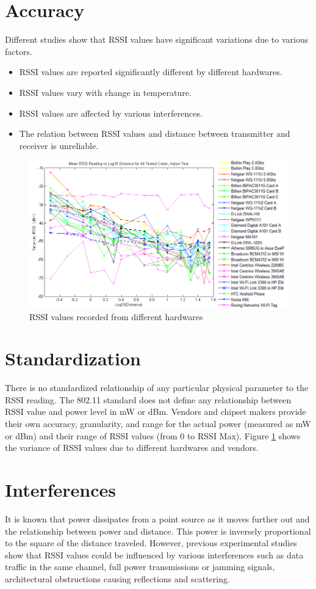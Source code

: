 \documentclass[11pt,a4paper,headinclude,footinclude,chapterprefix=on]{scrreprt}
\begin{document}
\section{Accuracy} Different studies \cite{ref:wifi:chipset} show that RSSI values have significant variations due to various factors. 
\begin{itemize}
	\item RSSI values are reported significantly different by different hardwares. 
	\item RSSI values vary with change in temperature. 
	\item RSSI values are affected by various interferences. 
	\item The relation between RSSI values and distance between transmitter and receiver is unreliable. 
\end{itemize}
\begin{figure}
	[!h] \centering 
	\includegraphics[width=13cm]{Images/rssi_vendor1.png} \caption{RSSI values recorded from different hardwares} \label{fig:rssi_vendors} 
\end{figure}

\section{Standardization} There is no standardized relationship of any particular physical parameter to the RSSI reading. The 802.11 standard does not define any relationship between RSSI value and power level in mW or dBm. Vendors and chipset makers provide their own accuracy, granularity, and range for the actual power (measured as mW or dBm) and their range of RSSI values (from 0 to RSSI Max). Figure \ref{fig:rssi_vendors} shows the variance of RSSI values due to different hardwares and vendors.

\section{Interferences} It is known that power dissipates from a point source as it moves further out and the relationship between power and distance. This power is inversely proportional to the square of the distance traveled. However, previous experimental studies show that RSSI values could be influenced by various interferences such as data traffic in the same channel, full power transmissions or jamming signals, architectural obstructions causing reflections and scattering.
\end{document}
